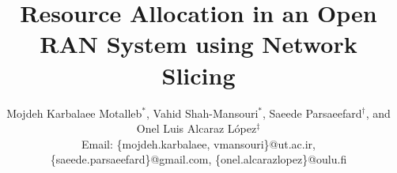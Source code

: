 \documentclass[lettersize,journal]{IEEEtran}
\begin{document}
\title{ Resource Allocation in an Open RAN System using Network Slicing\vspace{-.1cm}
}
\author{\small Mojdeh Karbalaee Motalleb$^*$, Vahid Shah-Mansouri$^*$, Saeede Parsaeefard$^\dagger$, and Onel Luis Alcaraz López$^\ddagger$ \\ Email: \{mojdeh.karbalaee, vmansouri\}@ut.ac.ir, \{saeede.parsaeefard\}@gmail.com, \{onel.alcarazlopez\}@oulu.fi\\
 }
\maketitle
{}
\end{document}
